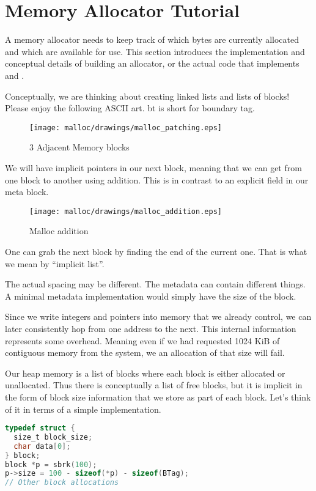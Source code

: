 \section{Memory Allocator Tutorial}

A memory allocator needs to keep track of which bytes are currently allocated and which are available for use.
This section introduces the implementation and conceptual details of building an allocator, or the actual code that implements  and .

Conceptually, we are thinking about creating linked lists and lists of blocks!
Please enjoy the following ASCII art.
bt is short for boundary tag.


\begin{figure}[H]
\centering
\texttt{[image: malloc/drawings/malloc\_patching.eps]}
\caption{3 Adjacent Memory blocks}
\end{figure}

We will have implicit pointers in our next block, meaning that we can get from one block to another using addition.
This is in contrast to an explicit  field in our meta block.

\begin{figure}[H]
\centering
\texttt{[image: malloc/drawings/malloc\_addition.eps]}
\caption{Malloc addition}
\end{figure}

One can grab the next block by finding the end of the current one.
That is what we mean by ``implicit list''.

The actual spacing may be different.
The metadata can contain different things.
A minimal metadata implementation would simply have the size of the block.

Since we write integers and pointers into memory that we already control, we can later consistently hop from one address to the next.
This internal information represents some overhead.
Meaning even if we had requested 1024 KiB of contiguous memory from the system, we an allocation of that size will fail.

Our heap memory is a list of blocks where each block is either allocated or unallocated.
Thus there is conceptually a list of free blocks, but it is implicit in the form of block size information that we store as part of each block.
Let's think of it in terms of a simple implementation.
\begin{lstlisting}[language=C]
typedef struct {
  size_t block_size;
  char data[0];
} block;
block *p = sbrk(100);
p->size = 100 - sizeof(*p) - sizeof(BTag);
// Other block allocations
\end{lstlisting}

